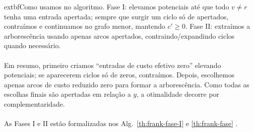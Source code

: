 \documentclass[12pt,a4paper]{article}
\def\emph#1{#1}%
\begin{document}
    	extbf{Como usamos no algoritmo.} Fase I: elevamos potenciais até que todo \(v\neq r\) tenha uma entrada apertada; sempre que surgir um ciclo só de apertados, contraímos e continuamos no grafo menor, mantendo \(c'\ge 0\). Fase II: extraímos a arborescência usando apenas arcos apertados, contraindo/expandindo ciclos quando necessário.
\paragraph{}

Em resumo, primeiro criamos “entradas de custo efetivo zero” elevando potenciais; se aparecerem ciclos só de zeros, contraímos. Depois, escolhemos apenas arcos de custo reduzido zero para formar a arborescência. Como todas as escolhas finais são \emph{apertadas} em relação a \(y\), a otimalidade decorre por complementaridade.

\paragraph{}
As Fases I e II estão formalizadas nos Alg.\ \ref{th:frank-fase-I} e \ref{th:frank-fase} \cite{frank2014}.

\end{document}
